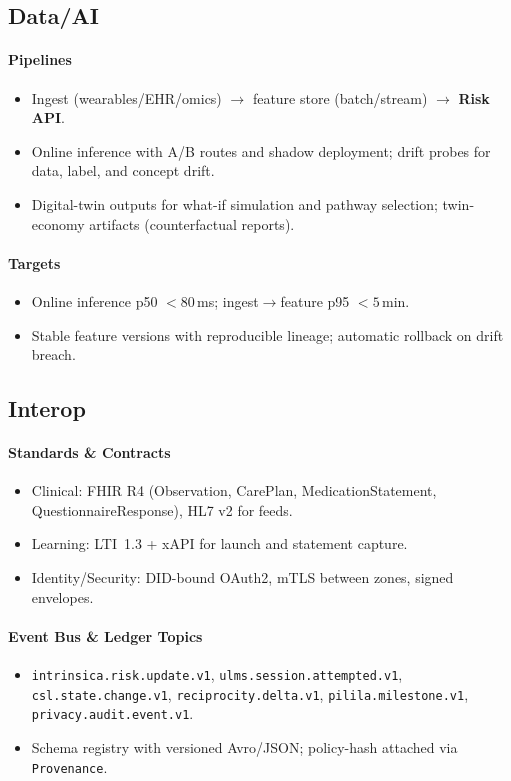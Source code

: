 \documentclass[11pt]{article}
\theoremstyle{plain}
\begin{document}
\subsection{Data/AI}
\paragraph{Pipelines}
\begin{itemize}
  \item Ingest (wearables/EHR/omics) \(\rightarrow\) feature store (batch/stream) \(\rightarrow\) \textbf{Risk API}.
  \item Online inference with A/B routes and shadow deployment; drift probes for data, label, and concept drift.
  \item Digital-twin outputs for what-if simulation and pathway selection; twin-economy artifacts (counterfactual reports).
\end{itemize}

\paragraph{Targets}
\begin{itemize}
  \item Online inference p50 $<80$\,ms; ingest\(\rightarrow\)feature p95 $<5$\,min.
  \item Stable feature versions with reproducible lineage; automatic rollback on drift breach.
\end{itemize}

\subsection{Interop}
\paragraph{Standards \& Contracts}
\begin{itemize}
  \item Clinical: FHIR R4 (Observation, CarePlan, MedicationStatement, QuestionnaireResponse), HL7 v2 for feeds.
  \item Learning: LTI~1.3 + xAPI for launch and statement capture.
  \item Identity/Security: DID-bound OAuth2, mTLS between zones, signed envelopes.
\end{itemize}

\paragraph{Event Bus \& Ledger Topics}
\begin{itemize}
  \item \texttt{intrinsica.risk.update.v1}, \texttt{ulms.session.attempted.v1}, \texttt{csl.state.change.v1},
        \texttt{reciprocity.delta.v1}, \texttt{pilila.milestone.v1}, \texttt{privacy.audit.event.v1}.
  \item Schema registry with versioned Avro/JSON; policy-hash attached via \texttt{Provenance}.
\end{itemize}
\end{document}
